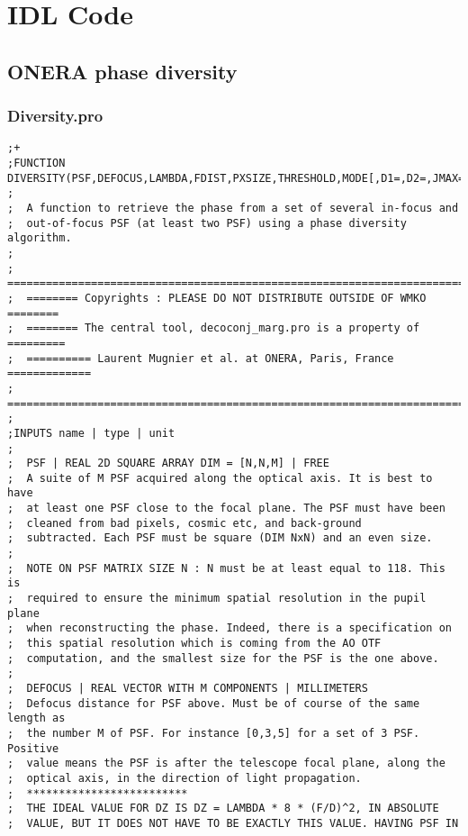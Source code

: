 \chapter{IDL Code}
\label{AppIDLCode}

\section{ONERA phase diversity}
\label{app:ONERAPD}

\subsection{Diversity.pro}
\label{subapp:diversity}

\begin{lstlisting}
;+
;FUNCTION DIVERSITY(PSF,DEFOCUS,LAMBDA,FDIST,PXSIZE,THRESHOLD,MODE[,D1=,D2=,JMAX=,/KECK,/LARGEHEX,/SHOW])
;
;  A function to retrieve the phase from a set of several in-focus and
;  out-of-focus PSF (at least two PSF) using a phase diversity algorithm.
;
;  =======================================================================
;  ======== Copyrights : PLEASE DO NOT DISTRIBUTE OUTSIDE OF WMKO ========
;  ======== The central tool, decoconj_marg.pro is a property of =========
;  ========== Laurent Mugnier et al. at ONERA, Paris, France =============
;  =======================================================================
;
;INPUTS name | type | unit
;
;  PSF | REAL 2D SQUARE ARRAY DIM = [N,N,M] | FREE
;  A suite of M PSF acquired along the optical axis. It is best to have
;  at least one PSF close to the focal plane. The PSF must have been
;  cleaned from bad pixels, cosmic etc, and back-ground
;  subtracted. Each PSF must be square (DIM NxN) and an even size.
;
;  NOTE ON PSF MATRIX SIZE N : N must be at least equal to 118. This is
;  required to ensure the minimum spatial resolution in the pupil plane
;  when reconstructing the phase. Indeed, there is a specification on
;  this spatial resolution which is coming from the AO OTF
;  computation, and the smallest size for the PSF is the one above.
;
;  DEFOCUS | REAL VECTOR WITH M COMPONENTS | MILLIMETERS
;  Defocus distance for PSF above. Must be of course of the same length as 
;  the number M of PSF. For instance [0,3,5] for a set of 3 PSF. Positive 
;  value means the PSF is after the telescope focal plane, along the
;  optical axis, in the direction of light propagation.
;  *************************
;  THE IDEAL VALUE FOR DZ IS DZ = LAMBDA * 8 * (F/D)^2, IN ABSOLUTE
;  VALUE, BUT IT DOES NOT HAVE TO BE EXACTLY THIS VALUE. HAVING PSF IN

\end{lstlisting}
